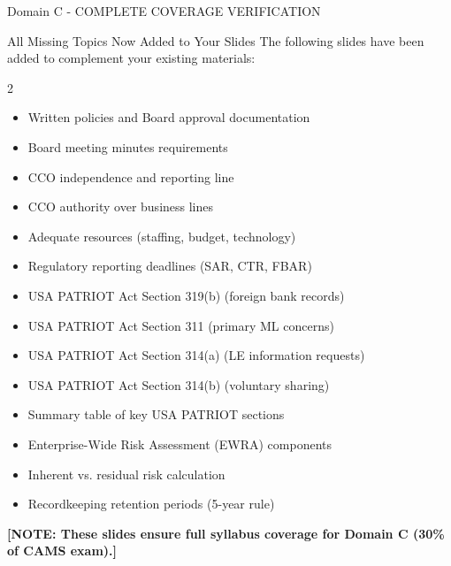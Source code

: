 \documentclass[11pt,a4paper]{beamer}
\newcommand{\bluenote}[1]{\textcolor{blue!80!black}{\textbf{[NOTE: #1]}}}  %
\begin{document}
\begin{frame}{Domain C - COMPLETE COVERAGE VERIFICATION}
	\begin{block}{All Missing Topics Now Added to Your Slides}
		The following slides have been added to complement your existing materials:
	\end{block}
	\begin{multicols}{2}
		\begin{itemize}
			\item Written policies and Board approval documentation
			\item Board meeting minutes requirements
			\item CCO independence and reporting line
			\item CCO authority over business lines
			\item Adequate resources (staffing, budget, technology)
			\item Regulatory reporting deadlines (SAR, CTR, FBAR)
			\item USA PATRIOT Act Section 319(b) (foreign bank records)
			\item USA PATRIOT Act Section 311 (primary ML concerns)
			\item USA PATRIOT Act Section 314(a) (LE information requests)
			\item USA PATRIOT Act Section 314(b) (voluntary sharing)
			\item Summary table of key USA PATRIOT sections
			\item Enterprise-Wide Risk Assessment (EWRA) components
			\item Inherent vs. residual risk calculation
			\item Recordkeeping retention periods (5-year rule)
		\end{itemize}
	\end{multicols}
	\vspace{0.2cm}
	\bluenote{These slides ensure full syllabus coverage for Domain C (30\% of CAMS exam).}
\end{frame}
\end{document}

